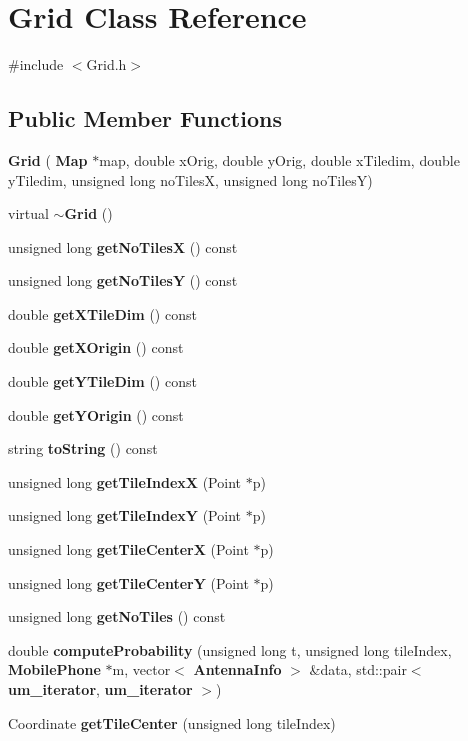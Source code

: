\section{Grid Class Reference}
\label{class_grid}


{\ttfamily \#include $<$Grid.\+h$>$}

\subsection*{Public Member Functions}
\begin{DoxyCompactItemize}
\item 
\textbf{ Grid} (\textbf{ Map} $\ast$map, double x\+Orig, double y\+Orig, double x\+Tiledim, double y\+Tiledim, unsigned long no\+TilesX, unsigned long no\+TilesY)
\item 
virtual \textbf{ $\sim$\+Grid} ()
\item 
unsigned long \textbf{ get\+No\+TilesX} () const
\item 
unsigned long \textbf{ get\+No\+TilesY} () const
\item 
double \textbf{ get\+X\+Tile\+Dim} () const
\item 
double \textbf{ get\+X\+Origin} () const
\item 
double \textbf{ get\+Y\+Tile\+Dim} () const
\item 
double \textbf{ get\+Y\+Origin} () const
\item 
string \textbf{ to\+String} () const
\item 
unsigned long \textbf{ get\+Tile\+IndexX} (Point $\ast$p)
\item 
unsigned long \textbf{ get\+Tile\+IndexY} (Point $\ast$p)
\item 
unsigned long \textbf{ get\+Tile\+CenterX} (Point $\ast$p)
\item 
unsigned long \textbf{ get\+Tile\+CenterY} (Point $\ast$p)
\item 
unsigned long \textbf{ get\+No\+Tiles} () const
\item 
double \textbf{ compute\+Probability} (unsigned long t, unsigned long tile\+Index, \textbf{ Mobile\+Phone} $\ast$m, vector$<$ \textbf{ Antenna\+Info} $>$ \&data, std\+::pair$<$ \textbf{ um\+\_\+iterator}, \textbf{ um\+\_\+iterator} $>$)
\item 
Coordinate \textbf{ get\+Tile\+Center} (unsigned long tile\+Index)
\end{DoxyCompactItemize}

